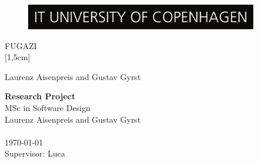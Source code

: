 \documentclass[
10pt, %
a4paper, %
oneside, %
headinclude,footinclude, %
] {book}%
\title{\normalfont\spacedallcaps{title}} %
\author{\spacedlowsmallcaps{author}} %
\date{} %
\begin{document}


\pagestyle{scrheadings} %



\hypersetup{pageanchor=false}
\begin{titlepage}
\thispagestyle{empty}
\begin{figure}[h!] %
\centering
\includegraphics[width=4in]{ITUlogo} 
\end{figure}

\begin{center}
\vspace{30 mm}
\begingroup \linespread{1,75} \selectfont 
\textsc{\LARGE FUGAZI}\\
[1,5cm]
\endgroup

Laurenz Aisenpreis and Gustav Gyrst\\[2,5cm]

\end{center}
\vfill
\textbf{Research Project}\\  %
MSc in Software Design\\  
Laurenz Aisenpreis and Gustav Gyrst\\
\\
\today\\
Supervisor: Luca
\end{titlepage}
\hypersetup{pageanchor=true}
\end{document}
